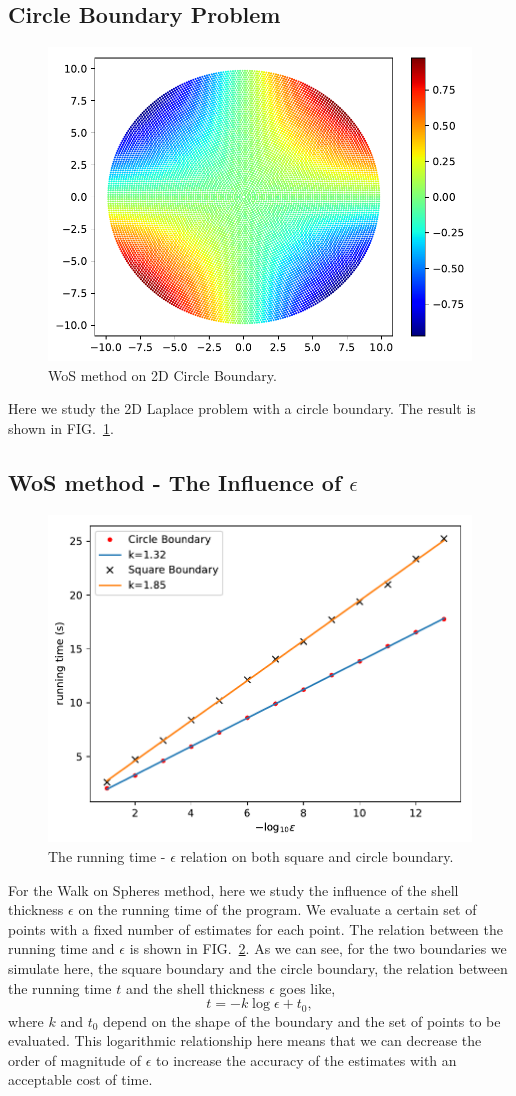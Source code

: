 \documentclass[aps, prl, reprint, groupedaddress]{revtex4-1}
\begin{document}
\subsection{Circle Boundary Problem}

\begin{figure}[htbp]
    \centering
    \includegraphics[width=.4\textwidth]{./figs/wos_c}
    \caption{\label{fig:wos_c} WoS method on 2D Circle Boundary.}
\end{figure}

Here we study the 2D Laplace problem with a circle boundary. The result is shown in FIG.~\ref{fig:wos_c}.

\subsection{WoS method - The Influence of $\epsilon$}

\begin{figure}[htbp]
    \centering
    \includegraphics[width=.4\textwidth]{./figs/ep_t}
    \caption{\label{fig:ep_t} The running time - $\epsilon$ relation on both square and circle boundary.}
\end{figure}

For the Walk on Spheres method, here we study the influence of the shell thickness $\epsilon$ on the running time of the program. We evaluate a certain set of points with a fixed number of estimates for each point. The relation between the running time and $\epsilon$ is shown in FIG.~\ref{fig:ep_t}. As we can see, for the two boundaries we simulate here, the square boundary and the circle boundary, the relation between the running time $t$ and the shell thickness $\epsilon$ goes like,
\begin{equation}
    t = -k\log\epsilon + t_0,
\end{equation}
where $k$ and $t_0$ depend on the shape of the boundary and the set of points to be evaluated. This logarithmic relationship here means that we can decrease the order of magnitude of $\epsilon$ to increase the accuracy of the estimates with an acceptable cost of time.
\end{document}
